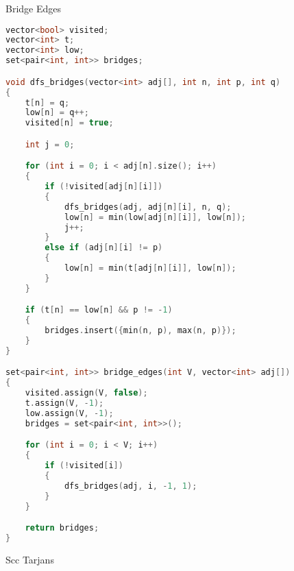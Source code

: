 \documentclass[leter]{amsart}
\begin{document}
Bridge Edges
\begin{multicols}{2}
\begin{lstlisting}[language=C++]
vector<bool> visited;
vector<int> t;
vector<int> low;
set<pair<int, int>> bridges;

void dfs_bridges(vector<int> adj[], int n, int p, int q)
{
    t[n] = q;
    low[n] = q++;
    visited[n] = true;

    int j = 0;

    for (int i = 0; i < adj[n].size(); i++)
    {
        if (!visited[adj[n][i]])
        {
            dfs_bridges(adj, adj[n][i], n, q);
            low[n] = min(low[adj[n][i]], low[n]);
            j++;
        }
        else if (adj[n][i] != p)
        {
            low[n] = min(t[adj[n][i]], low[n]);
        }
    }

    if (t[n] == low[n] && p != -1)
    {
        bridges.insert({min(n, p), max(n, p)});
    }
}

set<pair<int, int>> bridge_edges(int V, vector<int> adj[])
{
    visited.assign(V, false);
    t.assign(V, -1);
    low.assign(V, -1);
    bridges = set<pair<int, int>>();

    for (int i = 0; i < V; i++)
    {
        if (!visited[i])
        {
            dfs_bridges(adj, i, -1, 1);
        }
    }

    return bridges;
}

\end{lstlisting}
\end{multicols}
Scc Tarjans
\end{document}
